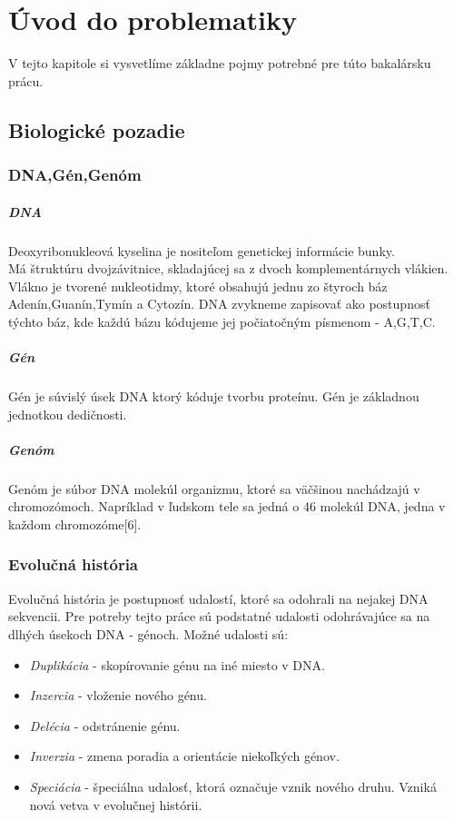 \chapter{Úvod do problematiky}
V tejto kapitole si vysvetlíme základne pojmy potrebné pre túto bakalársku prácu.
\section{Biologické pozadie}
\subsection{DNA,Gén,Genóm}
\paragraph{DNA}
Deoxyribonukleová kyselina je nositeľom genetickej informácie bunky.\\
Má štruktúru dvojzávitnice, skladajúcej sa z dvoch komplementárnych vlákien.
Vlákno je tvorené nukleotidmy, ktoré obsahujú jednu zo štyroch báz Adenín,Guanín,Tymín a Cytozín.
DNA zvykneme zapisovať ako postupnosť týchto báz, kde každú bázu kódujeme jej počiatočným písmenom - A,G,T,C.

\paragraph{Gén}
Gén je súvislý úsek DNA ktorý kóduje tvorbu proteínu. Gén je základnou jednotkou dedičnosti.

\paragraph{Genóm}
Genóm je súbor DNA molekúl organizmu, ktoré sa väčšinou nachádzajú v chromozómoch.
Napríklad v ľudskom tele sa jedná o 46 molekúl DNA, jedna v každom chromozóme[6].
\subsection{Evolučná história}\label{evhist}
Evolučná história je postupnosť udalostí, ktoré sa odohrali na nejakej DNA sekvencii.
Pre potreby tejto práce sú podstatné udalosti odohrávajúce sa na dlhých úsekoch DNA - génoch.
\newline
Možné udalosti sú:
\newline
\begin{itemize}
\item \emph{Duplikácia} - skopírovanie génu na iné miesto v DNA.
\item \emph{Inzercia} - vloženie nového génu.
\item \emph{Delécia} - odstránenie génu.
\item \emph{Inverzia} - zmena poradia a orientácie niekoľkých génov.
\item \emph{Speciácia} - špeciálna udalosť, ktorá označuje vznik nového druhu. Vzniká nová vetva v evolučnej histórii.
\end{itemize}

